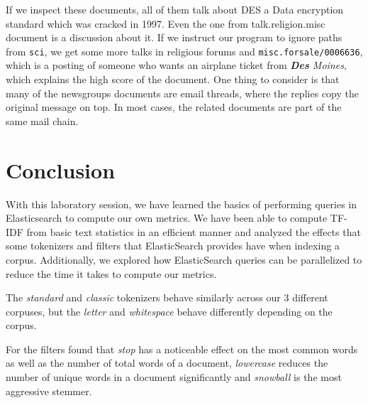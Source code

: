 If we inspect these documents, all of them talk about DES \cite{noauthor_data_2022} a Data encryption
standard which was cracked in 1997. Even the one from talk.religion.misc document is a discussion about it.
If we instruct our program to ignore paths from \texttt{sci}, we get some more talks in religious forums
and \texttt{misc.forsale/0006636}, which is a posting of someone who wants an airplane ticket
from \emph{\textbf{Des} Moines}, which explains the high score of the document. One thing to consider is that
many of the newsgroups documents are email threads, where the replies copy the original message on top. In most
cases, the related documents are part of the same mail chain.




\section{Conclusion}

With this laboratory session, we have learned the basics of performing queries in Elasticsearch
to compute our own metrics. We have been able to compute TF-IDF from basic text statistics in an efficient
manner and analyzed the effects that some tokenizers and filters that ElasticSearch provides
have when indexing a corpus. Additionally, we explored how ElasticSearch queries can be parallelized to
reduce the time it takes to compute our metrics.

The \emph{standard} and \emph{classic} tokenizers behave similarly across our 3 different corpuses,
but the \emph{letter} and \emph{whitespace} behave differently depending on the corpus.

For the filters found that \emph{stop} has a noticeable effect on the most common words as well as the number of total words
of a document, \emph{lowercase} reduces the number of unique words in a document significantly and 
\emph{snowball} is the most aggressive stemmer.

